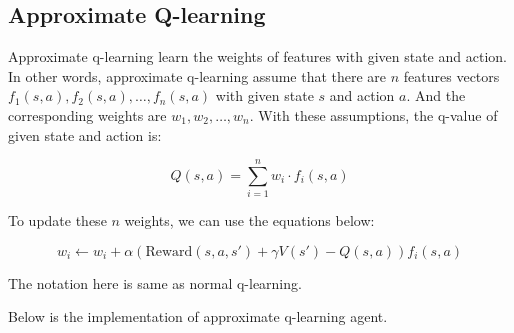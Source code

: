 \documentclass{article}[12pt]
\begin{document}
\subsection{Approximate Q-learning}

Approximate q-learning learn the weights of features with given state and action. In other words, approximate q-learning assume that there are $n$ features vectors $f_1(s, a), f_2(s, a), \dots, f_n(s, a)$ with given state $s$ and action $a$. And the corresponding weights are $w_1, w_2, \dots, w_n$. With these assumptions, the q-value of given state and action is:

\begin{equation}
Q(s, a) = \sum_{i=1}^{n} w_i \cdot f_i(s, a)
\end{equation}

To update these $n$ weights, we can use the equations below:

\begin{equation}
w_i \leftarrow w_i + \alpha \left(\text{Reward}(s, a, s')+\gamma V(s') - Q(s, a)\right)f_i(s, a)
\end{equation}

The notation here is same as normal q-learning.

Below is the implementation of approximate q-learning agent.
\end{document}
